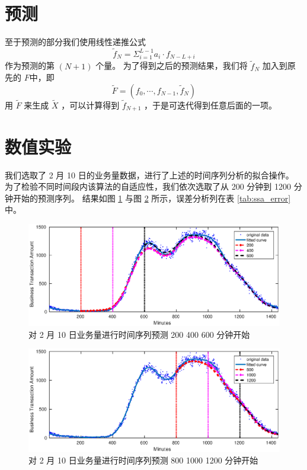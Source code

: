 \documentclass[a4paper]{article}
\begin{document}
\section{预测}
至于预测的部分我们使用线性递推公式
\begin{equation}
	\label{eqn:ssa_prediction}
	\tilde{f}_N = \Sigma_{i=1}^{L-1} a_i \cdot f_{N-L+i} 
\end{equation}
作为预测的第 $(N+1)$ 个量。
为了得到之后的预测结果，我们将 $\tilde{f}_N$ 加入到原先的 $F$中，即
\begin{equation}
	\label{eqn:ssa_new_f}
	\tilde{F} = (f_0, \cdots, f_{N-1}, \tilde{f}_N)
\end{equation}
用 $\tilde{F}$ 来生成 $\tilde{X}$ ，可以计算得到 $\tilde{f}_{N+1}$ ，于是可迭代得到任意后面的一项。

\section{数值实验}
我们选取了 2 月 10  日的业务量数据，进行了上述的时间序列分析的拟合操作。
为了检验不同时间段内该算法的自适应性，我们依次选取了从 200 分钟到 1200 分钟开始的预测序列。
结果如图 \ref{fig:ssa-200-400-600} 与图 \ref{fig:ssa-800-1000-1200} 所示，误差分析列在表 \ref{tab:ssa_error} 中。
\begin{figure}[htbp]
	\centering
	\includegraphics[scale=0.6]{pic/trade_amount_2_10_200_400_600.eps}
	\caption{对 2 月 10 日业务量进行时间序列预测 200 400 600 分钟开始}
    \label{fig:ssa-200-400-600}
\end{figure}
\begin{figure}[htbp]
	\centering
	\includegraphics[scale=0.6]{pic/trade_amount_2_10_800_1000_1200.eps}
	\caption{对 2 月 10 日业务量进行时间序列预测 800 1000 1200 分钟开始}
    \label{fig:ssa-800-1000-1200}
\end{figure}
\end{document}
